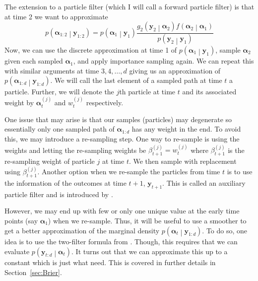 \documentclass[notitlepage]{article}
\renewcommand{\vec}[1]{\bm{#1}}
\newcommand{\Lparen}[1]{\left( #1\right)}
\newcommand{\Cond}[2]{ #1 \middle\vert  #2}
\newcommand{\optor}[2]{#1\Lparen{#2}}
\newcommand{\optorC}[3]{\optor{#1}{\Cond{#2}{#3}}}
\newcommand{\pdensC}[2]{\optorC{p}{#1}{#2}}
\newcommand{\partic}[3]{#1_{#2}^{\Lparen{#3}}}
\newcommand{\nPeriods}{d}
\begin{document}
The extension to a particle filter (which I will call a forward particle filter) is that at 
time 2 we want to approximate %
%
$$
\pdensC{\vec\alpha_{1:2}}{\vec y_{1:2}} = 
	\pdensC{\vec\alpha_1}{\vec y_1}\frac{
		\optorC{g_2}{\vec y_2}{\vec\alpha_2}\optorC{f}{\vec\alpha_2}{\vec\alpha_1}
	}{
		\pdensC{\vec y_2}{\vec y_1}
	}
$$%
% 
Now, we can use the discrete approximation at time 1 of $\pdensC{\vec\alpha_1}{\vec y_1}$, 
sample $\vec \alpha_2$ given each sampled $\vec\alpha_1$, and apply importance sampling 
again. We can repeat this with similar arguments at time $3,4,\dots,\nPeriods$ giving us an approximation 
of $\pdensC{\vec\alpha_{1:\nPeriods}}{\vec y_{1:\nPeriods}}$. We will call the last element of 
a sampled path at time $t$ a particle. Further, we will denote the $j$th particle at time $t$ 
and its associated weight by $\partic{\vec\alpha}tj$ and $\partic wtj$ respectively.  

One issue that may arise is that 
our samples (particles) may degenerate so essentially only one sampled path of $\vec\alpha_{1:\nPeriods}$ 
has any weight in the end. 
To avoid this, we may introduce a re-sampling step. One way to re-sample is using the weights 
and letting the re-sampling weights be $\partic\beta{t+1}j = \partic wtj$ where $\partic\beta{t+1}j$ is 
the re-sampling weight of particle $j$ at time $t$. We then sample with replacement using 
$\partic\beta{t+1}j$. Another option when we re-sample the particles from time 
$t$ is to use the information of the outcomes at time $t+1$, $\vec y_{t+1}$. This is called 
an auxiliary particle filter and is introduced by \cite{pitt99}.

However, we may end up with few or only one unique value at the early time 
points (say $\vec\alpha_1$) when we re-sample. Thus, it will be useful to use a smoother to get 
a better approximation of the marginal density $\pdensC{\vec\alpha_t}{\vec y_{1:\nPeriods}}$. To do so, 
one idea is to use the two-filter formula from \cite{kitagawa94}. Though, this requires that
we can evaluate $\pdensC{\vec{y}_{t:d}}{\vec{\alpha}_t}$. It turns out that we can approximate 
this up to a constant which is just what need. This is covered in further details in Section~\ref{sec:Brier}. 
\end{document}

